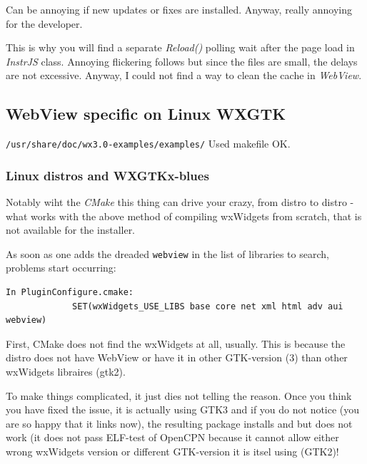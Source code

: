 \documentclass[11pt]{article}
\begin{document}
    Can be annoying if new updates or fixes are installed. Anyway, really
annoying for the developer.

    This is why you will find a separate \emph{Reload()} polling wait after
the page load in \emph{InstrJS} class. Annoying flickering follows but
since the files are small, the delays are not excessive. Anyway, I could
not find a way to clean the cache in \emph{WebView}.

    \hypertarget{webview-specific-on-linux-wxgtk}{%
\subsection{\texorpdfstring{WebView specific on Linux
\textbf{WXGTK}}{WebView specific on Linux WXGTK}}\label{webview-specific-on-linux-wxgtk}}

    \texttt{/usr/share/doc/wx3.0-examples/examples/} Used makefile OK.

    \hypertarget{linux-distros-and-wxgtkx-blues}{%
\subsubsection{Linux distros and
WXGTKx-blues}\label{linux-distros-and-wxgtkx-blues}}

    Notably wiht the \emph{CMake} this thing can drive your crazy, from
distro to distro - what works with the above method of compiling
wxWidgets from scratch, that is not available for the installer.

    As soon as one adds the dreaded \texttt{webview} in the list of
libraries to search, problems start occurring:

    \begin{verbatim}
In PluginConfigure.cmake:
             SET(wxWidgets_USE_LIBS base core net xml html adv aui webview)
\end{verbatim}

    First, CMake does not find the wxWidgets at all, usually. This is
because the distro does not have WebView or have it in other GTK-version
(3) than other wxWidgets libraires (gtk2).

    To make things complicated, it just dies not telling the reason. Once
you think you have fixed the issue, it is actually using GTK3 and if you
do not notice (you are so happy that it links now), the resulting
package installs and but does not work (it does not pass ELF-test of
OpenCPN because it cannot allow either wrong wxWidgets version or
different GTK-version it is itsel using (GTK2)!
\end{document}
